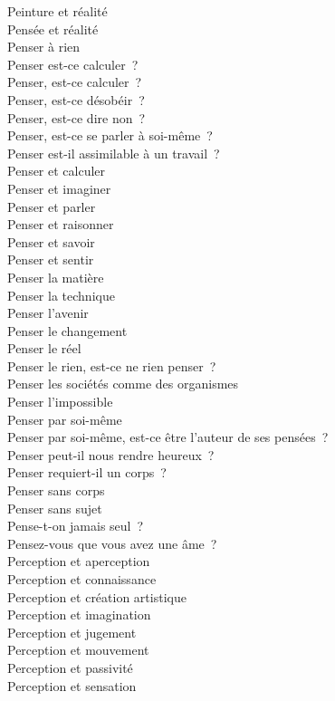 \documentclass[a4paper,12pt]{article}
\begin{document}
Peinture et réalité \\
Pensée et réalité \\
Penser à rien \\
Penser est-ce calculer ? \\
Penser, est-ce calculer ? \\
Penser, est-ce désobéir ? \\
Penser, est-ce dire non ? \\
Penser, est-ce se parler à soi-même ? \\
Penser est-il assimilable à un travail ? \\
Penser et calculer \\
Penser et imaginer \\
Penser et parler \\
Penser et raisonner \\
Penser et savoir \\
Penser et sentir \\
Penser la matière \\
Penser la technique \\
Penser l'avenir \\
Penser le changement \\
Penser le réel \\
Penser le rien, est-ce ne rien penser ? \\
Penser les sociétés comme des organismes \\
Penser l'impossible \\
Penser par soi-même \\
Penser par soi-même, est-ce être l'auteur de ses pensées ? \\
Penser peut-il nous rendre heureux ? \\
Penser requiert-il un corps ? \\
Penser sans corps \\
Penser sans sujet \\
Pense-t-on jamais seul ? \\
Pensez-vous que vous avez une âme ? \\
Perception et aperception \\
Perception et connaissance \\
Perception et création artistique \\
Perception et imagination \\
Perception et jugement \\
Perception et mouvement \\
Perception et passivité \\
Perception et sensation \\
\end{document}
